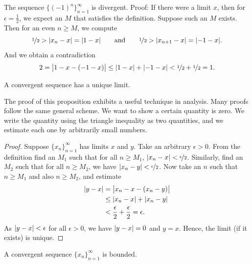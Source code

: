 \begin{example}
The sequence $\bigl\{ {(-1)}^n \bigr\}_{n=1}^\infty$ is divergent.  Proof: If there
were a limit $x$, then for $\epsilon = \frac{1}{2}$, we expect an $M$ that
satisfies the definition.  Suppose
such an $M$ exists.
Then for an even $n \geq M$, we compute
\begin{equation*}
\nicefrac{1}{2} > \lvert {x_n - x} \rvert  = \lvert {1 - x} \rvert
\qquad \text{and} \qquad
\nicefrac{1}{2} > \lvert {x_{n+1} - x} \rvert  = \lvert {-1 - x} \rvert .
\end{equation*}
And we obtain a contradiction
\begin{equation*}
2 = \bigl\lvert {1 - x - (-1 -x)} \bigr\rvert \leq
\lvert {1 - x} \rvert + \lvert {-1 -x} \rvert < \nicefrac{1}{2} + \nicefrac{1}{2} = 1 .
\end{equation*}
\end{example}

\begin{prop} \label{prop:limisunique}
A convergent sequence has a unique limit.
\end{prop}

The proof of this proposition exhibits a useful technique in
analysis.  Many proofs follow the same general scheme.  We want to
show a certain quantity is zero.  We write the quantity using the 
triangle inequality as two quantities, and we estimate each one
by arbitrarily small numbers.

\begin{proof}
Suppose $\{ x_n \}_{n=1}^\infty$ has limits $x$ and $y$.
Take an arbitrary $\epsilon > 0$.
From the definition find an $M_1$ such that for all $n \geq M_1$,
$\lvert {x_n-x} \rvert < \nicefrac{\epsilon}{2}$.  Similarly, find an $M_2$
such that for all $n \geq M_2$, we have
$\lvert {x_n-y} \rvert < \nicefrac{\epsilon}{2}$.
Now take an $n$ such that $n \geq M_1$ and also $n \geq M_2$, and estimate
\begin{equation*}
\begin{split}
\lvert {y-x} \rvert
& =
\bigl\lvert {x_n-x - (x_n -y)} \bigr\rvert \\
& \leq
\lvert {x_n-x} \rvert + \lvert {x_n -y} \rvert \\
& <
\frac{\epsilon}{2} + \frac{\epsilon}{2} = \epsilon .
\end{split}
\end{equation*}
As $\lvert {y-x} \rvert < \epsilon$ for all $\epsilon > 0$, we have $\lvert {y-x} \rvert = 0$
and $y=x$.  Hence, the limit (if it exists) is unique.
\end{proof}

\begin{prop}
A convergent sequence $\{ x_n \}_{n=1}^\infty$ is bounded.
\end{prop}

